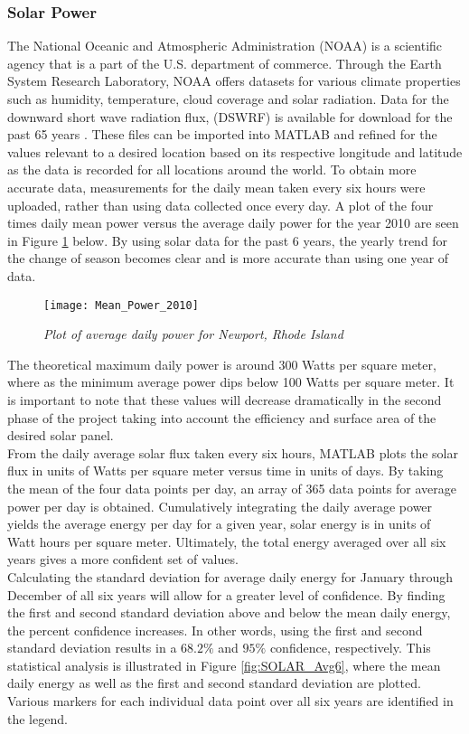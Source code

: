 
\subsubsection{Solar Power}
\indent The National Oceanic and Atmospheric Administration (NOAA) is a scientific agency that is a part of the U.S. department of commerce. Through the Earth System Research Laboratory, NOAA offers datasets for various climate properties such as humidity, temperature, cloud coverage and solar radiation. Data for the downward short wave radiation flux, (DSWRF) is available for download for the past 65 years \cite{Kistler01thencepncar}. These files can be imported into MATLAB and refined for the values relevant to a desired location based on its respective longitude and latitude as the data is recorded for all locations around the world. To obtain more accurate data, measurements for the daily mean taken every six hours were uploaded, rather than using data collected once every day. A plot of the four times daily mean power versus the average daily power for the year 2010 are seen in Figure \ref{fig:SOLAR_avg_power} below. By using solar data for the past 6 years, the yearly trend for the change of season becomes clear and is more accurate than using one year of data.\\

\begin{figure}[H]
\centering
\texttt{[image: Mean\_Power\_2010]}
\caption{\textit{Plot of average daily power for Newport, Rhode Island}}
\label{fig:SOLAR_avg_power}
\end{figure}
\indent The theoretical maximum daily power is around 300 Watts per square meter, where as the minimum average power dips below 100 Watts per square meter. It is important to note that these values will decrease dramatically in the second phase of the project taking into account the efficiency and surface area of the desired solar panel. \\
\indent From the daily average solar flux taken every six hours, MATLAB plots the solar flux in units of Watts per square meter versus time in units of days. By taking the mean of the four data points per day, an array of 365 data points for average power per day is obtained. Cumulatively integrating the daily average power yields the average energy per day for a given year, solar energy is in units of Watt hours per square meter. Ultimately, the total energy averaged over all six years gives a more confident set of values. \\
\indent Calculating the standard deviation for average daily energy for January through December of all six years will allow for a greater level of confidence. By finding the first and second standard deviation above and below the mean daily energy, the percent confidence increases. In other words, using the first and second standard deviation results in a $68.2\%$ and $95\%$ confidence, respectively. This statistical analysis is illustrated in Figure \ref{fig:SOLAR_Avg6}, where the mean daily energy as well as the first and second standard deviation are plotted. Various markers for each individual data point over all six years are identified in the legend.\\

